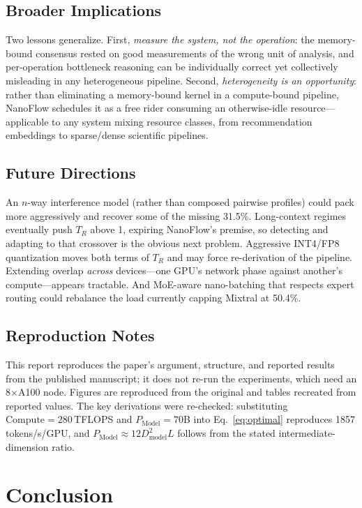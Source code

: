 \documentclass[manuscript,review]{acmart}
\newcommand{\nf}{NanoFlow\xspace}   %
\newcommand{\Pmodel}{P_{\mathrm{Model}}}
\newcommand{\Dmodel}{D_{\mathrm{model}}}
\newcommand{\compute}{\mathrm{Compute}}
\begin{document}
\subsection{Broader Implications}

Two lessons generalize. First, \emph{measure the system, not the operation}: the memory-bound consensus rested 
on good measurements of the wrong unit of analysis, and per-operation bottleneck reasoning can be individually 
correct yet collectively misleading in any heterogeneous pipeline. Second, 
\emph{heterogeneity is an opportunity}: rather than eliminating a memory-bound kernel in a compute-bound 
pipeline, \nf schedules it as a free rider consuming an otherwise-idle resource---applicable to any system 
mixing resource classes, from recommendation embeddings to sparse/dense scientific pipelines.

\subsection{Future Directions}

An $n$-way interference model (rather than composed pairwise profiles) could pack more aggressively and recover 
some of the missing 31.5\%. Long-context regimes eventually push $T_R$ above 1, expiring \nf's premise, so 
detecting and adapting to that crossover is the obvious next problem. Aggressive INT4/FP8 quantization moves 
both terms of $T_R$ and may force re-derivation of the pipeline. Extending overlap \emph{across} devices---one 
GPU's network phase against another's compute---appears tractable. And MoE-aware nano-batching that respects 
expert routing could rebalance the load currently capping Mixtral at 50.4\%.

\subsection{Reproduction Notes}

This report reproduces the paper's argument, structure, and reported results from the published manuscript; it 
does not re-run the experiments, which need an 8$\times$A100 node. Figures are reproduced from the original and 
tables recreated from reported values. The key derivations were re-checked: substituting $\compute = 280$\,TFLOPS 
and $\Pmodel = 70$B into Eq.~\ref{eq:optimal} reproduces 1857 tokens/s/GPU, and $\Pmodel \approx 12\Dmodel^2 L$ 
follows from the stated intermediate-dimension ratio.

\section{Conclusion}
\end{document}
